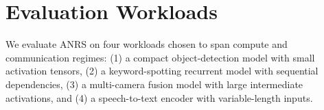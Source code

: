 \section{Evaluation Workloads}

We evaluate ANRS on four workloads chosen to span compute and communication regimes: (1) a compact object-detection model with small activation tensors, (2) a keyword-spotting recurrent model with sequential dependencies, (3) a multi-camera fusion model with large intermediate activations, and (4) a speech-to-text encoder with variable-length inputs.

